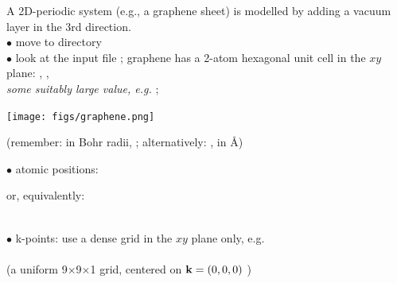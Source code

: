 \documentclass[landscape]{foils}
\begin{document}
%
\parbox{17cm}{A 2D-periodic system (e.g., a graphene sheet) is
  modelled by adding a vacuum layer in the 3rd direction.\\[-0.5em]

  $\bullet$ move to  directory\\[-0.5em]
  
  $\bullet$ look at the input file ;
  graphene has a 2-atom hexagonal unit cell in the $xy$ plane:
  , ,\\
  \textit{some suitably large value, e.g.} ;
}
\hfill \parbox{8cm}{
  \texttt{[image: figs/graphene.png]}\\
}

{\small (remember:  in Bohr radii, ;
  alternatively: ,  in \AA)}

\parbox{12cm}{
  $\bullet$  atomic positions:\\
}
\hskip 2cm
\parbox{12cm}{
  or, equivalently:\\
}\\

$\bullet$ k-points: use a dense grid in the $xy$ plane only, e.g.\\
\\
(a uniform 9$\times$9$\times$1 grid, centered on ${\bf k}=(0,0,0)$ )


\end{document}
